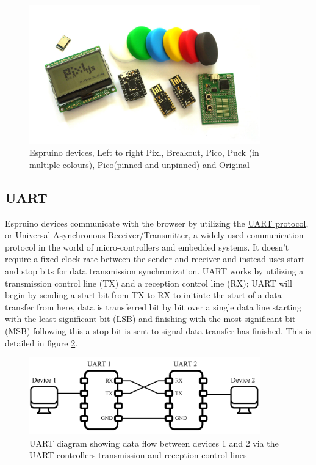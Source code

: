 \documentclass{l4proj}
\begin{document}
\begin{figure}[!ht]
    \centering
    \includegraphics[width=10cm]{dissertation/images/espruino_devices.jpg}
    \caption{Espruino devices, Left to right Pixl, Breakout, Pico, Puck (in multiple colours), Pico(pinned and unpinned) and Original}
    \label{fig:espruinodevices}
\end{figure}
    
\subsection{UART}
\text Espruino devices communicate with the browser by utilizing the \href{https://erg.abdn.ac.uk/users/gorry/eg3576/UART.html}{UART protocol}, or Universal Asynchronous Receiver/Transmitter, a widely used communication protocol in the world of micro-controllers and embedded systems. It doesn't require a fixed clock rate between the sender and receiver and instead uses start and stop bits for data transmission synchronization. UART works by utilizing a transmission control line (TX) and a reception control line (RX); UART will begin by sending a start bit from TX to RX to initiate the start of a data transfer from here, data is transferred bit by bit over a single data line starting with the least significant bit (LSB) and finishing with the most significant bit (MSB) following this a stop bit is sent to signal data transfer has finished. This is detailed in figure \ref{fig:UART}.

\begin{figure}[!ht]
\begin{center}
    \includegraphics[width=10cm]{dissertation/images/UART_diagram.png}
\end{center}
\caption{UART diagram showing data flow between devices 1 and 2 via the UART controllers transmission and reception control lines}
    \label{fig:UART}
\end{figure}
\end{document}
